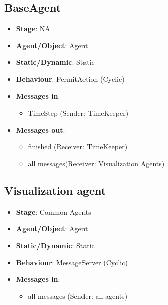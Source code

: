 \documentclass[12pt]{article}
\begin{document}
\subsection{BaseAgent}
\begin{itemize}
    \item \textbf{Stage}: NA
    \item \textbf{Agent/Object}: Agent
    \item \textbf{Static/Dynamic}: Static  
    \item \textbf{Behaviour}: PermitAction (Cyclic)
    \item \textbf{Messages in}:
        \begin{itemize}
            \item  TimeStep (Sender: TimeKeeper)
        \end{itemize}
    \item \textbf{Messages out}:
        \begin{itemize}
            \item  finished (Receiver: TimeKeeper)
            \item  all messages(Receiver: Visualization Agents)
        \end{itemize}
\end{itemize}
\newpage{}

\subsection{Visualization agent}
\begin{itemize}
    \item \textbf{Stage}: Common Agents 
    \item \textbf{Agent/Object}: Agent
    \item \textbf{Static/Dynamic}: Static
    \item \textbf{Behaviour}: MessageServer (Cyclic)
    \item \textbf{Messages in}:
        \begin{itemize}
            \item  all messages (Sender: all agents)
        \end{itemize}
\end{itemize}
\newpage{}
\end{document}
